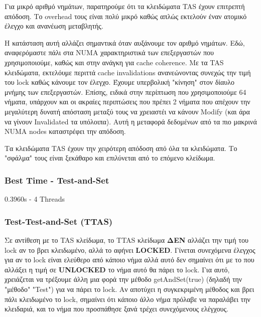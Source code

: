 \documentclass[letterpaper,12pt]{article}
\begin{document}
Για μικρό αριθμό νημάτων, παρατηρούμε ότι τα κλειδώματα TAS έχουν επιτρεπτή απόδοση.
Το overhead τους είναι πολύ μικρό καθώς απλώς εκτελούν έναν ατομικό έλεγχο και ανανέωση
μεταβλητής.

Η κατάσταση αυτή αλλάζει σημαντικά όταν αυξάνουμε τον αριθμό νημάτων. Εδώ, αναφερόμαστε πάλι
στα NUMA χαρακτηριστικά των επεξεργαστών που χρησιμοποιούμε, καθώς και στην ανάγκη για cache
coherence. Με τα TAS κλειδώματα, εκτελόυμε περιττά
cache invalidations ανανεώνοντας συνεχώς την τιμή του lock καθώς κάνουμε τον έλεγχο. Έχουμε 
υπερβολική "κίνηση" στον δίαυλο μνήμης των επεξεργαστών. Επίσης, ειδικά στην περίπτωση που 
χρησιμοποιούμε 64 νήματα, υπάρχουν και οι ακραίες περιπτώσεις που πρέπει 2 νήματα που απέχουν
την μεγαλύτερη δυνατή απόσταση μεταξύ τους να χρειαστέι να κάνουν Modify (και άρα να γίνουν Invalidated
τα υπόλοιπα). Αυτή η μεταφορά δεδομένων από τα πιο μακρινά NUMA nodes καταστρέφει την απόδοση.

Τα κλειδώματα TAS έχουν την χειρότερη απόδοση από όλα τα κλειδώματα. Το "σφάλμα" τους είναι 
ξεκάθαρο και επιλύνεται από το επόμενο κλείδωμα.

\subsubsection*{Best Time - Test-and-Set}
0.3960s - 4 Threads


\subsubsection{Test-Test-and-Set (TTAS)}

Σε αντίθεση με το TAS κλείδωμα, το TTAS κλείδωμα \textbf{ΔΕΝ} αλλάζει την τιμή του lock αν το βρει
κλειδωμένο, αλλά το αφήνει \textbf{LOCKED}. Γίνεται συνεχόμενα έλεγχος για αν το lock είναι ελεύθερο
από κάποιο νήμα αλλά αυτό δεν σημαίνει ότι με το που αλλάξει η τιμή σε \textbf{UNLOCKED} το νήμα
αυτό θα πάρει το lock. Για αυτό, χρειάζεται να τρέξουμε άλλη μια φορά την μέθοδο getAndSet(true) (δηλαδή την
"μέθοδο" "Test") για να πάρει το lock. Αν αποτύχει η συγκεκριμένη μέθοδος και βρει πάλι κλειδωμένο το lock, σημαίνει ότι
κάποιο άλλο νήμα πρόλαβε να παραλάβει την κλειδαριά, και το νήμα που προσπάθησε ξανά τρέχει συνεχόμενους 
ελέγχους.
\end{document}
